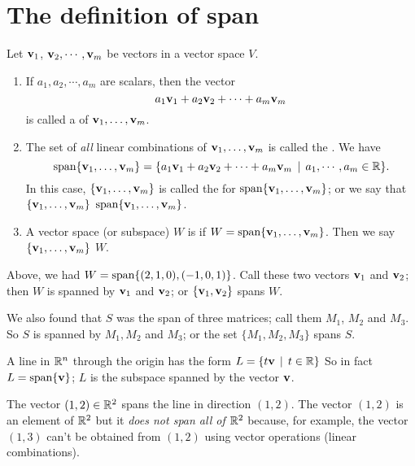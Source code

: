\section{The definition of span}
Let $\mathbf{v}_1$, $\mathbf{v}_2, \cdots, \mathbf{v}_m$ be vectors in a vector
space $V$.
\begin{definition}
 \begin{enumerate} 
\item If $a_1, a_2, \cdots, a_m$ are scalars, then the
vector
$$
a_1\mathbf{v}_1 + a_2\mathbf{v}_2 + \cdots + a_m \mathbf{v}_m
$$
is called a  of $\mathbf{v}_1, \ldots, \mathbf{v}_m$.
\item The set of \emph{all} linear combinations of $\mathbf{v}_1, \ldots, \mathbf{v}_m$
is called the .  We have
$$
\textrm{span}\{\mathbf{v}_1, \ldots, \mathbf{v}_m\} = \{ a_1\mathbf{v}_1 + a_2\mathbf{v}_2 + \cdots + a_m \mathbf{v}_m \,\mid \, a_1, \cdots, a_m \in \mathbb{R}\}.
$$
In this case, $\{ \mathbf{v}_1, \ldots, \mathbf{v}_m\}$ is called the 
for $\textrm{span}\{\mathbf{v}_1, \ldots, \mathbf{v}_m\}$; or we say that $\{ \mathbf{v}_1, \ldots, \mathbf{v}_m\}$
 $\textrm{span}\{\mathbf{v}_1, \ldots, \mathbf{v}_m\}$.
\item A vector space (or subspace) $W$ is  if $W = \textrm{span}\{\mathbf{v}_1, \ldots, \mathbf{v}_m\}$.  Then we say $\{  \mathbf{v}_1, \ldots, \mathbf{v}_m\}$  $W$.
\end{enumerate}
\end{definition}

\begin{myexample} Above, we had $W = \textrm{span}\{ (2,1,0), (-1,0,1)\}$.  Call these
two vectors $\mathbf{v}_1$ and $\mathbf{v}_2$; then $W$ is spanned by $\mathbf{v}_1$ and $\mathbf{v}_2$;
or $\{ \mathbf{v}_1,\mathbf{v}_2\}$ spans $W$. \end{myexample}

\begin{myexample} We also found that $S$ was the span of three matrices; call them
$M_1$, $M_2$ and $M_3$.  So $S$ is spanned by $M_1, M_2$ and $M_3$; or
the set $\{M_1, M_2, M_3\}$ spans $S$.
\end{myexample}

\begin{myexample} A line in $\mathbb{R}^n$ through the origin has the form $L = \{ t\mathbf{v} \,\mid \, t\in \mathbb{R}\}$
So in fact $L = \textrm{span}\{ \mathbf{v}\}$; $L$ is the subspace spanned by the vector
$\mathbf{v}$.
\end{myexample}

\begin{myexample} The vector $(1,2)\in \mathbb{R}^2$ spans the line in direction $(1,2)$.
The vector $(1,2)$ is an element of $\mathbb{R}^2$ but it \emph{does not
span all of $\mathbb{R}^2$} because, for example, the vector $(1,3)$ can't
be obtained from $(1,2)$ using vector operations (linear combinations).
\end{myexample}

